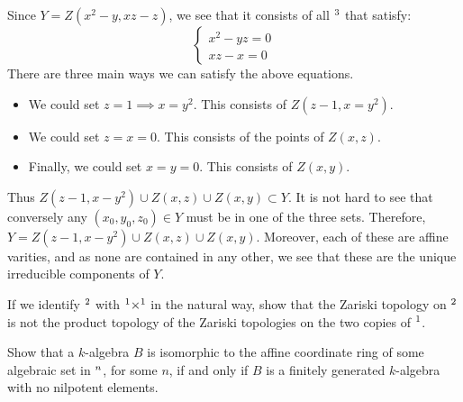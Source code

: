 \documentclass{hw_pset} %
\let\aa\relax
\DeclareMathOperator{\aa}{\mathbf{A}} %
\begin{document}
\begin{solution}
    Since $Y = Z(x^2 - y, xz - z)$,  we see that it consists of all $\aa^3$ that 
    satisfy:
    \[
        \begin{cases}
            x^2 - yz = 0\\
            xz - x = 0
        \end{cases}
    \]
    There are three main ways we can satisfy the above equations. 
    \begin{itemize}
        \item We could set $z = 1 \implies x = y^2$. This consists of $Z(z - 1, x = y^2)$.
        \item We could set $z = x = 0$. This consists of the points of $Z(x, z)$.
        \item Finally, we could set $x = y = 0$. This consists of $Z(x,y)$. 
    \end{itemize}
    Thus $Z(z - 1, x - y^2) \cup Z(x, z) \cup Z(x, y) \subset Y$. It is not 
    hard to see that conversely any $(x_0, y_0, z_0) \in Y$ must be in 
    one of the three sets. Therefore, $Y = Z(z - 1, x - y^2) \cup Z(x, z) \cup Z(x, y)$. 
    Moreover, each of these are affine varities, and as none are contained in any 
    other, we see that these are the unique irreducible components of $Y$.

\end{solution}

\begin{exercise}[1.4]
    If we identify $\aa^2$ with $\aa^1 \times \aa^1$ in the natural way, show
    that the Zariski topology on $\aa^2$ is not the product topology of the
    Zariski topologies on the two copies of $\aa^1$.
\end{exercise}

\begin{solution}

\end{solution}

\begin{exercise}[1.5]
    Show that a $k$-algebra $B$ is isomorphic to the affine coordinate ring of
    some algebraic set in $\aa^n$, for some $n$, if and only if $B$ is a
    finitely generated $k$-algebra with no nilpotent elements.
\end{exercise}
\end{document}
